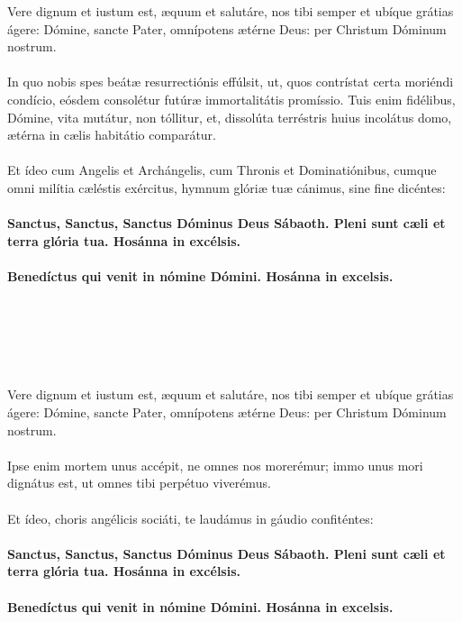 \documentclass[12pt, a4paper]{article}
\begin{document}
	\\
	\\
	\\
	\\
	\\
	Vere dignum et iustum est, æquum
	et salutáre, nos tibi semper et
	ubíque grátias ágere: Dómine,
	sancte Pater, omnípotens ætérne
	Deus: per Christum Dóminum
	nostrum.
	\\\\
	In quo nobis spes beátæ
	resurrectiónis effúlsit,
	ut, quos contrístat certa moriéndi
	condício, eósdem consolétur
	futúræ immortalitátis promíssio.
	Tuis enim fidélibus, Dómine, vita
	mutátur, non tóllitur, et, dissolúta
	terréstris huius incolátus domo,
	ætérna in cælis habitátio
	comparátur.
	\\\\
	Et ídeo cum Angelis et
	Archángelis, cum Thronis et
	Dominatiónibus, cumque omni
	milítia cæléstis exércitus, hymnum
	glóriæ tuæ cánimus, sine fine
	dicéntes:
	\\\\
	\textbf{Sanctus, Sanctus, Sanctus Dóminus
		Deus Sábaoth. Pleni sunt cæli et
		terra glória tua. Hosánna in
		excélsis.}
	\\\\
	\textbf{Benedíctus qui venit in nómine
		Dómini. Hosánna in excelsis.}
	
	\newpage
	
	\\
	\\
	\\
	\\
	\\
	Vere dignum et iustum est, æquum
	et salutáre, nos tibi semper et
	ubíque grátias ágere: Dómine,
	sancte Pater, omnípotens ætérne
	Deus: per Christum Dóminum
	nostrum.
	\\\\
	Ipse enim mortem unus accépit,
	ne omnes nos morerémur;
	immo unus mori dignátus est,
	ut omnes tibi perpétuo viverémus.
	\\\\
	Et ídeo, choris angélicis sociáti,
	te laudámus in gáudio confiténtes:
	\\\\
	\textbf{Sanctus, Sanctus, Sanctus Dóminus
		Deus Sábaoth. Pleni sunt cæli et
		terra glória tua. Hosánna in
		excélsis.}
	\\\\
	\textbf{Benedíctus qui venit in nómine
		Dómini. Hosánna in excelsis.}
	
\end{document}
